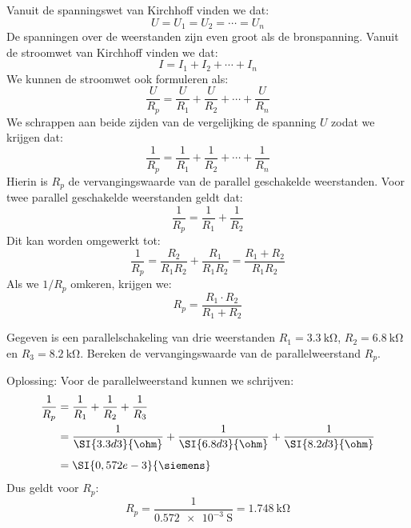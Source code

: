 Vanuit de spanningswet van Kirchhoff vinden we dat:
%
\begin{equation}
U = U_1 = U_2 = \cdots = U_n
\end{equation}
%
De spanningen over de weerstanden zijn even groot als de bronspanning.
Vanuit de stroomwet van Kirchhoff vinden we dat:
%
\begin{equation}
I = I_1 + I_2 + \cdots + I_n
\end{equation}
%
We kunnen de stroomwet ook formuleren als:
%
\begin{equation}
\dfrac{U}{R_p} = \dfrac{U}{R_1} + \dfrac{U}{R_2} + \cdots + \dfrac{U}{R_n}
\end{equation}
%
We schrappen aan beide zijden van de vergelijking de spanning $U$ zodat we krijgen dat:
%
\begin{equation}
\dfrac{1}{R_p} = \dfrac{1}{R_1} + \dfrac{1}{R_2} + \cdots + \dfrac{1}{R_n}
\end{equation}
%
Hierin is $R_p$ de vervangingswaarde van de parallel geschakelde weerstanden.
Voor twee parallel geschakelde weerstanden geldt dat:
\begin{equation}
\dfrac{1}{R_p} = \dfrac{1}{R_1} + \dfrac{1}{R_2}
\end{equation}
%
Dit kan worden omgewerkt tot:
%
\begin{equation}
\dfrac{1}{R_p} = \dfrac{R_2}{R_1R_2} + \dfrac{R_1}{R_1R_2} = \dfrac{R_1+R_2}{R_1R_2}
\end{equation}
%
Als we $1/R_p$ omkeren, krijgen we:
\begin{equation}
R_p = \dfrac{R_1\cdot R_2}{R_1+R_2}
\end{equation}

\begin{example}
Gegeven is een parallelschakeling van drie weerstanden $R_1 = \SI{3.3}{\kilo\ohm}$,
$R_2 = \SI{6.8}{\kilo\ohm}$ en $R_3 = \SI{8.2}{\kilo\ohm}$. Bereken de vervangingswaarde
van de parallelweerstand $R_p$.

Oplossing: Voor de parallelweerstand kunnen we schrijven:
\begin{equation}
\begin{split}
\dfrac{1}{R_p} &= \dfrac{1}{R_1} + \dfrac{1}{R_2} + \dfrac{1}{R_3} \\
               &= \dfrac{1}{\SI{3.3d3}{\ohm}} + \dfrac{1}{\SI{6.8d3}{\ohm}} + \dfrac{1}{\SI{8.2d3}{\ohm}} \\[1ex]
               &= \SI{0,572e-3}{\siemens}
\end{split}
\end{equation}
%
Dus geldt voor $R_p$:
\begin{equation}
R_p = \dfrac{1}{\SI{0,572e-3}{\siemens}} = \SI{1,748}{\kilo\ohm}
\end{equation}
\end{example}

